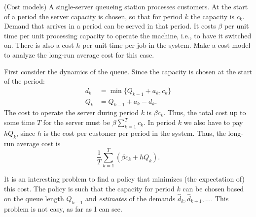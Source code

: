 \begin{question}(Cost models) A single-server queueing station
  processes customers. At the start of a period the server capacity is
  chosen, so that for period $k$ the capacity is $c_k$. Demand that
  arrives in a period can be served in that period. It costs $\beta$
  per unit time per unit processing capacity to operate the machine,
  i.e., to have it switched on. There is also a cost $h$ per unit time
  per job in the system. Make a cost model to analyze the long-run
  average cost for this case.
  \begin{solution}
First consider the dynamics of the queue. Since the capacity is chosen at the start of the period:
\begin{align*}
  d_k &= \min\{Q_{k-1}+a_k, c_k\} \\
Q_k &= Q_{k-1}+a_k - d_k.
\end{align*}
The cost to operate the server during period $k$ is $\beta c_k$.
Thus, the total cost up to some time $T$ for the server must be
$\beta \sum_{k=1}^T c_k$. In period $k$ we also have to pay $h Q_k$,
since $h$ is the cost per customer per period in the system. Thus, the
long-run average cost is
    \begin{equation*}
      \frac 1T\sum_{k=1}^T \left(\beta c_k + h Q_k\right).
    \end{equation*}

    It is an interesting problem to find a policy that minimizes (the
    expectation of) this cost. The policy is such that the capacity
    for period $k$ can be chosen based on the queue length $Q_{k-1}$
    and \emph{estimates} of the demands
    $\hat d_k, \hat d_{k+1}, \ldots$. This problem is not easy, as far as I can see. 

  \end{solution}
\end{question}

